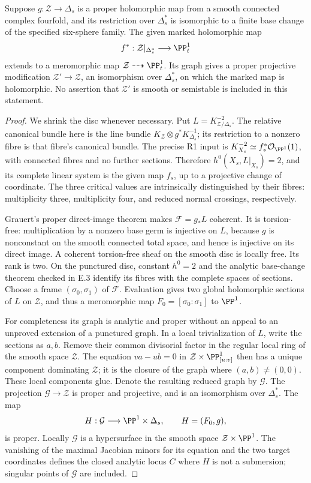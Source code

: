 \begin{proposition}\label{push:src:B.4.4}
Suppose $g:\mathcal Z\to\Delta_s$ is a proper holomorphic map
from a smooth connected complex fourfold, and its restriction
over $\Delta_s^*$ is
isomorphic to a finite base change of the specified six-sphere
family. The given marked holomorphic map
\[
 f^*:\mathcal Z|_{\Delta_s^*}\longrightarrow\PP^1_t
\]
extends to a meromorphic map $\mathcal Z\dashrightarrow\PP^1_t$.
Its graph gives a proper projective modification
$\mathcal Z'\to\mathcal Z$, an isomorphism over
$\Delta_s^*$, on which the marked map is holomorphic.
No assertion that $\mathcal Z'$ is smooth or semistable is
included in this statement.
\end{proposition}
\begin{proof}
We shrink the disc whenever necessary. Put
$L=K_{\mathcal Z/\Delta_s}^{-2}$. The relative canonical
bundle here is the line bundle
$K_{\mathcal Z}\otimes g^*K_{\Delta_s}^{-1}$; its
restriction to a nonzero fibre is that fibre's canonical bundle.
The precise R1 input is
$K_{X_s}^{-2}\simeq f_s^*\mathcal O_{\PP^1}(1)$,
with connected fibres and no further sections. Therefore
$h^0(X_s,L|_{X_s})=2$, and its complete linear system is
the given map $f_s$, up to a projective change of coordinate.
The three critical values are intrinsically distinguished by
their fibres: multiplicity three, multiplicity four, and reduced
normal crossings, respectively.

Grauert's proper direct-image theorem
\citep[Section 6, Hauptsatz I]{Grauert60push} makes
$\mathcal F=g_*L$ coherent. It is torsion-free: multiplication
by a nonzero base germ is injective on $L$, because $g$ is
nonconstant on the smooth connected total space, and hence is injective on
its direct image. A coherent torsion-free sheaf on the smooth
disc is locally free. Its rank is two. On the punctured disc,
constant $h^0=2$ and the analytic base-change theorem checked
in E.3 identify its fibres with the complete spaces of sections.
Choose a frame $(\sigma_0,\sigma_1)$ of $\mathcal F$.
Evaluation gives two global holomorphic sections of $L$ on
$\mathcal Z$, and thus a meromorphic map
$F_0=[\sigma_0:\sigma_1]$ to $\PP^1$.

For completeness its graph is analytic and proper without an
appeal to an unproved extension of a punctured graph. In a local
trivialization of $L$, write the sections as $a,b$. Remove their
common divisorial factor in the regular local ring of the smooth
space $\mathcal Z$. The equation
$v a-u b=0$ in $\mathcal Z\times\PP^1_{[u:v]}$
then has a unique component dominating $\mathcal Z$; it is
the closure of the graph where $(a,b)\ne(0,0)$. These local
components glue. Denote the resulting reduced graph by
$\mathcal G$. The projection $\mathcal G\to\mathcal Z$
is proper and projective, and is an isomorphism over
$\Delta_s^*$. The map
\[
 H:\mathcal G\longrightarrow\PP^1\times\Delta_s,
 \qquad H=(F_0,g),
\]
is proper. Locally $\mathcal G$ is a hypersurface in the smooth
space $\mathcal Z\times\PP^1$. The vanishing of the maximal
Jacobian minors for its equation and the two target coordinates
defines the closed analytic locus $C$ where $H$ is not a
submersion; singular points of $\mathcal G$ are included.


\end{proof}
